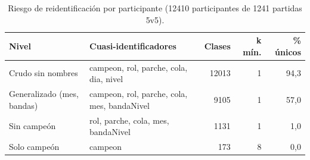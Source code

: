 \begin{table}[H]
\centering
\small
\caption{Riesgo de reidentificación por participante (12410 participantes de 1241 partidas 5v5).}
\label{tab:riesgo}
\begin{tabular}{p{3.2cm}p{6.2cm}rrr}
\toprule
Nivel & Cuasi-identificadores & Clases & k mín. & \% únicos \\
\midrule
Crudo sin nombres & campeon, rol, parche, cola, dia, nivel & 12013 & 1 & 94,3 \\
Generalizado (mes, bandas) & campeon, rol, parche, cola, mes, bandaNivel & 9105 & 1 & 57,0 \\
Sin campeón & rol, parche, cola, mes, bandaNivel & 1131 & 1 & 1,0 \\
Solo campeón & campeon & 173 & 8 & 0,0 \\
\bottomrule
\end{tabular}
\end{table}
